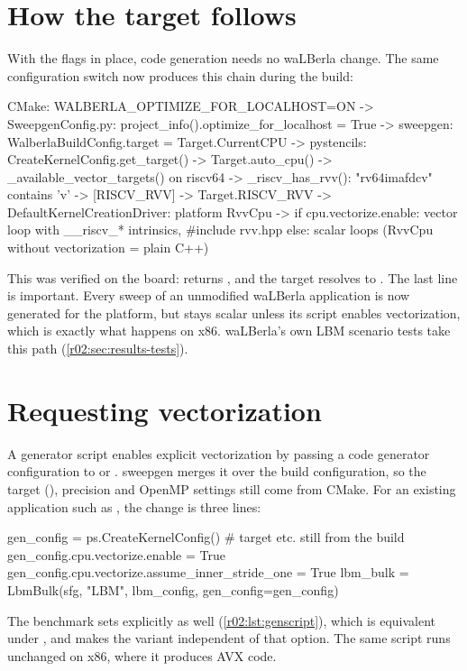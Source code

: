 \section{How the target follows}\label{r02:sec:wlb-target-chain}

With the flags in place, code generation needs no waLBerla change. The same
configuration switch now produces this chain during the build:
\begin{plaincode}[basicstyle=\ttfamily\scriptsize]
CMake:     WALBERLA_OPTIMIZE_FOR_LOCALHOST=ON
  -> SweepgenConfig.py:   project_info().optimize_for_localhost = True
  -> sweepgen:            WalberlaBuildConfig.target = Target.CurrentCPU
  -> pystencils:          CreateKernelConfig.get_target()
                            -> Target.auto_cpu()
                            -> _available_vector_targets() on riscv64
                            -> _riscv_has_rvv(): "rv64imafdcv" contains 'v'  -> [RISCV_RVV]
                          -> Target.RISCV_RVV
                          -> DefaultKernelCreationDriver: platform RvvCpu
  -> if cpu.vectorize.enable:  vector loop with __riscv_* intrinsics, #include rvv.hpp
     else:                     scalar loops (RvvCpu without vectorization = plain C++)
\end{plaincode}
This was verified on the board:  returns
, and the target resolves to . The last
line is important. Every sweep of an unmodified waLBerla application is now generated
for the  platform, but stays scalar unless its script enables
vectorization, which is exactly what happens on x86. waLBerla's own LBM scenario tests
take this path (\cref{r02:sec:results-tests}).

\section{Requesting vectorization}\label{r02:sec:wlb-optin}

A generator script enables explicit vectorization by passing a code generator
configuration to  or . sweepgen merges it over the build
configuration, so the target (), precision and OpenMP settings still
come from CMake. For an existing application such as , the
change is three lines:
\begin{pycode}
gen_config = ps.CreateKernelConfig()                 # target etc. still from the build
gen_config.cpu.vectorize.enable = True
gen_config.cpu.vectorize.assume_inner_stride_one = True
lbm_bulk = LbmBulk(sfg, "LBM", lbm_config, gen_config=gen_config)
\end{pycode}
The benchmark sets  explicitly as well
(\cref{r02:lst:genscript}), which is equivalent under
, and makes the variant independent of
that option. The same script runs unchanged on x86, where it produces AVX code.


